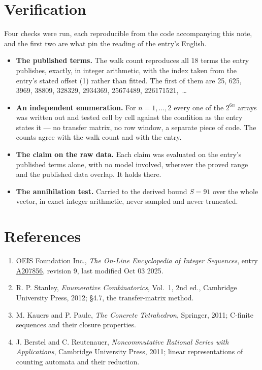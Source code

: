 \documentclass[11pt]{article}
\theoremstyle{definition}
\begin{document}
\section{Verification}

Four checks were run, each reproducible from the code accompanying this note, and the first two are what pin the reading of the entry's English.

\begin{itemize}

\item {\bfseries The published terms.} The walk count reproduces all 18 terms the entry publishes, exactly, in integer arithmetic, with the index taken from the entry's stated offset (1) rather than fitted. The first of them are 25, 625, 3969, 38809, 328329, 2934369, 25674489, 226171521,~\dots

\item {\bfseries An independent enumeration.} For $n = 1,\dots,2$ every one of the $2^{6n}$ arrays was written out and tested cell by cell against the condition as the entry states it --- no transfer matrix, no row window, a separate piece of code. The counts agree with the walk count and with the entry.

\item {\bfseries The claim on the raw data.} Each claim was evaluated on the entry's published terms alone, with no model involved, wherever the proved range and the published data overlap. It holds there.

\item {\bfseries The annihilation test.} Carried to the derived bound $S = 91$ over the whole vector, in exact integer arithmetic, never sampled and never truncated.

\end{itemize}

\section{References}

\begin{enumerate}

\item OEIS Foundation Inc., \emph{The On-Line Encyclopedia of Integer Sequences}, entry \href{https://oeis.org/A207856}{A207856}, revision 9, last modified Oct 03 2025.

\item R. P. Stanley, \emph{Enumerative Combinatorics}, Vol.~1, 2nd ed., Cambridge University Press, 2012; \S4.7, the transfer-matrix method.

\item M. Kauers and P. Paule, \emph{The Concrete Tetrahedron}, Springer, 2011; C-finite sequences and their closure properties.

\item J. Berstel and C. Reutenauer, \emph{Noncommutative Rational Series with Applications}, Cambridge University Press, 2011; linear representations of counting automata and their reduction.

\end{enumerate}
\end{document}
